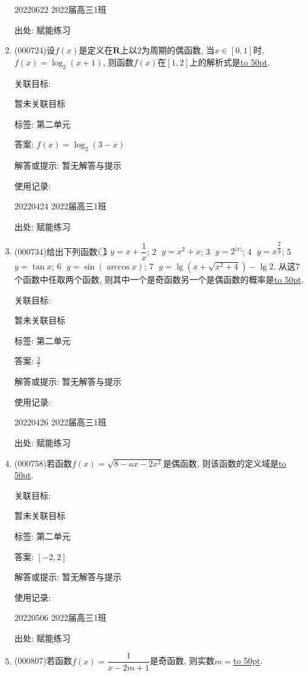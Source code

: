 \documentclass[10pt,a4paper]{article}
\newcommand{\blank}[1]{\underline{\hbox to #1pt{}}}
\begin{document}
\begin{enumerate}[1.]
20220622	2022届高三1班  	


出处: 赋能练习
\item { (000724)}设$f(x)$是定义在$\mathbf{R}$上以$2$为周期的偶函数, 当$x\in [0,1]$时, $f(x)=\log_2(x+1)$, 则函数$f(x)$在$[1,2]$上的解析式是\blank{50}.


关联目标:

暂未关联目标



标签: 第二单元

答案: $f(x)=\log_2(3-x)$

解答或提示: 暂无解答与提示

使用记录:

20220424	2022届高三1班	


出处: 赋能练习
\item { (000734)}给出下列函数: \textcircled{1} $y=x+\dfrac1x$; \textcircled{2} $y={x^2}+x$; \textcircled{3} $y={2^{|x|}}$; \textcircled{4} $y={x^{\dfrac23}}$; \textcircled{5} $y=\tan x$; \textcircled{6} $y=\sin(\arccos x)$; \textcircled{7} $y=\lg(x+\sqrt{{x^2}+4})-\lg 2$. 从这$7$个函数中任取两个函数, 则其中一个是奇函数另一个是偶函数的概率是\blank{50}.


关联目标:

暂未关联目标



标签: 第二单元

答案: $\frac 37$

解答或提示: 暂无解答与提示

使用记录:

20220426	2022届高三1班	


出处: 赋能练习
\item { (000758)}若函数$f(x)=\sqrt{8-ax-2x^2}$是偶函数, 则该函数的定义域是\blank{50}.


关联目标:

暂未关联目标



标签: 第二单元

答案: $[-2,2]$

解答或提示: 暂无解答与提示

使用记录:

20220506	2022届高三1班	


出处: 赋能练习
\item { (000807)}若函数$f(x)=\dfrac1{x-2m+1}$是奇函数, 则实数$m=$\blank{50}.



\end{enumerate}
\end{document}
